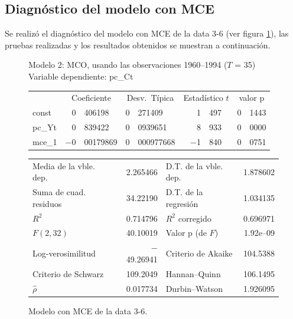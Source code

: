 \documentclass[12pt]{article}
\begin{document}
\subsection*{Diagnóstico del modelo con MCE}
Se realizó el diagnóstico del modelo con MCE de la data 3-6 (ver figura \ref{fig:mce_modelo}), las pruebas realizadas y los resultados obtenidos se muestran a continuación.
\begin{figure}[h!]
    \begin{center}

        Modelo 2: MCO, usando las observaciones 1960--1994 ($T$ = 35)\\
        Variable dependiente: pc\_Ct\\
        
        \vspace{1em}
        
        \begin{tabular}{lr@{.}lr@{.}lr@{.}lr@{.}l}
          &
         \multicolumn{2}{c}{Coeficiente} &
          \multicolumn{2}{c}{Desv.\ Típica} &
           \multicolumn{2}{c}{Estadístico $t$} &
            \multicolumn{2}{c}{valor p} \\[1ex]
        const &
          0&406198 &
            0&271409 &
              1&497 &
                0&1443 \\
        pc\_Yt &
          0&839422 &
            0&0939651 &
              8&933 &
                0&0000 \\
        mce\_1 &
          $-$0&00179869 &
            0&000977668 &
              $-$1&840 &
                0&0751 \\
        \end{tabular}
        
        \vspace{1ex}
        \begin{tabular}{lrlr}
        Media de la vble. dep. &  2.265466 & D.T. de la vble. dep. &  1.878602 \\
        Suma de cuad. residuos &  34.22190 & D.T. de la regresión &  1.034135 \\
        $R^2$ &  0.714796 & $R^2$ corregido &  0.696971 \\
        $F(2, 32)$ &  40.10019 & Valor p (de $F$) &  1.92\textrm{e--09} \\
        Log-verosimilitud & $-$49.26941 & Criterio de Akaike &  104.5388 \\
        Criterio de Schwarz &  109.2049 & Hannan--Quinn &  106.1495 \\
        $\hat{\rho}$ &  0.017734 & Durbin--Watson &  1.926095 \\
        \end{tabular}
        \end{center}
    \caption{Modelo con MCE de la data 3-6.}
    \label{fig:mce_modelo}     
\end{figure}
\end{document}
